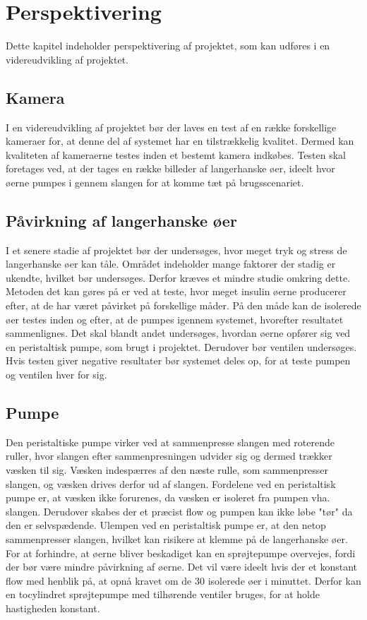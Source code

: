 \chapter{Perspektivering}
Dette kapitel indeholder perspektivering af projektet, som kan udføres i en videreudvikling af projektet.
\section{Kamera}
 I en videreudvikling af projektet bør der laves en test af en række forskellige kameraer for, at denne del af systemet har en tilstrækkelig kvalitet. Dermed kan kvaliteten af kameraerne testes inden et bestemt kamera indkøbes. Testen skal foretages ved, at der tages en række billeder af langerhanske øer, ideelt hvor øerne pumpes i gennem slangen for at komme tæt på brugsscenariet. 

\section{Påvirkning af langerhanske øer}
I et senere stadie af projektet bør der undersøges, hvor meget tryk og stress de langerhanske øer kan tåle. Området indeholder mange faktorer der stadig er ukendte, hvilket bør undersøges. Derfor kræves et mindre studie omkring dette. Metoden det kan gøres på er ved at teste, hvor meget insulin øerne producerer efter, at de har været påvirket på forskellige måder. På den måde kan de isolerede øer testes inden og efter, at de pumpes igennem systemet, hvorefter  resultatet sammenlignes. Det skal blandt andet undersøges, hvordan øerne opfører sig ved en peristaltisk pumpe, som brugt i projektet. Derudover bør ventilen undersøges. Hvis testen giver negative resultater bør systemet deles op, for at teste pumpen og ventilen hver for sig.

\section{Pumpe}
Den peristaltiske pumpe virker ved at sammenpresse slangen med roterende ruller, hvor slangen efter sammenpresningen udvider sig  og dermed trækker væsken til sig. Væsken indespærres af den næste rulle, som sammenpresser slangen, og væsken drives derfor ud af slangen. Fordelene ved en peristaltisk pumpe er, at væsken ikke forurenes, da væsken er isoleret fra pumpen vha. slangen. Derudover skabes der et præcist flow og pumpen kan ikke løbe "tør"  da den er selvspædende. Ulempen ved en peristaltisk pumpe er, at den netop sammenpresser slangen, hvilket kan risikere at klemme på de langerhanske øer. For at forhindre, at øerne bliver beskadiget kan en sprøjtepumpe overvejes, fordi der bør være mindre påvirkning af øerne. Det vil være ideelt hvis der et konstant flow med henblik på, at opnå kravet om de 30 isolerede øer i minuttet. Derfor kan en tocylindret sprøjtepumpe med tilhørende ventiler bruges, for at holde hastigheden konstant. 

